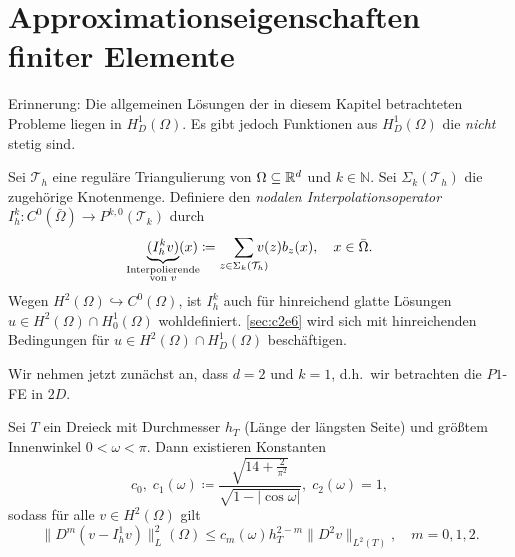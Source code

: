 \documentclass[../skript.tex]{subfiles}
\begin{document}
\section{Approximationseigenschaften finiter Elemente}\label{sec:c2e5}
Erinnerung: Die allgemeinen Lösungen der in diesem Kapitel betrachteten Probleme liegen in $H^1_D(\Omega)$. Es gibt jedoch Funktionen aus $H^1_D(\Omega)$ die \emph{nicht} stetig sind.
\begin{definition}\label{def:c2e5s1}
	Sei $\mathcal{T}_h$ eine reguläre Triangulierung von $\Omega\subseteq\mathbb{R}^d$ und $k\in\mathbb{N}$. Sei $\Sigma_k(\mathcal{T}_h)$ die zugehörige Knotenmenge. Definiere den \emph{nodalen Interpolationsoperator} $I_h^k:C^0(\bar{\Omega})\to P^{k,0}(\mathcal{T}_k)$ durch 
	\[
		\underbrace{(I_h^k v)}_{\mathclap{\substack{\text{Interpolierende} \\ \text{von } v}}}(x) \coloneqq \sum_{z\in \Sigma_k(\mathcal{T}_h)} \hspace*{-10pt} v(z)b_z(x),\quad x\in\bar{\Omega}.
	\]  
	Wegen $H^2(\Omega)\hookrightarrow C^0(\Omega)$, ist $I_h^k$ auch für hinreichend glatte Lösungen $u\in H^2(\Omega)\cap H^1_0(\Omega)$ wohldefiniert. \cref{sec:c2e6} wird sich mit hinreichenden Bedingungen für $u\in H^2(\Omega)\cap H^1_D(\Omega)$ beschäftigen.
\end{definition}
Wir nehmen jetzt zunächst an, dass $d=2$ und $k=1$, d.h.\ wir betrachten die $P1$-FE in $2D$.
\begin{theorem}[Interpolationsfehlerabschätzung]\label{thm:c2e5s2}
	Sei $T$ ein Dreieck mit Durchmesser $h_T$ (Länge der längsten Seite) und größtem Innenwinkel $0 < \omega < \pi$. Dann existieren Konstanten 
	\[
		c_0,\;c_1(\omega)\coloneqq\frac{\sqrt{{1}{4}+\frac{2}{\pi^2}}}{\sqrt{1-|\cos{\omega}|}},\; c_2(\omega) = 1,
	\]
	sodass für alle $v\in H^2(\Omega)$ gilt
	\[
		\| D^m(v-I_h^1 v)\|_L^2(\Omega) \leq c_m(\omega)h_T^{2-m}\| D^2 v\|_{L^2(T)},\quad m=0,1,2.
	\]
\end{theorem}
\end{document}
